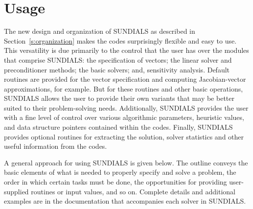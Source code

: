 \section{Usage} 
\label{s:usage}

The new design and organization of SUNDIALS 
as described in Section~\ref{s:organization}
makes the codes surprisingly flexible and easy to use.
This versatility is due primarily to the control that the user has
over the modules that comprise SUNDIALS: the specification of vectors;
the linear solver and preconditioner methods; the basic solvers; and,
sensitivity analysis.
Default routines are provided for the vector specification and
computing Jacobian-vector approximations, for example. But for these
routines and other basic operations, SUNDIALS allows the user to provide
their own variants that may be better suited to their problem-solving
needs. 
Additionally, SUNDIALS provides the user with a fine level of control
over various algorithmic parameters, heuristic values, and data
structure pointers contained within the codes.
Finally, SUNDIALS provides optional routines for extracting the
solution, solver statistics and other useful information from the codes.

A general approach for using SUNDIALS is given below. 
The outline conveys the basic elements of what is needed to properly
specify and solve a problem, the order in which certain tasks must be
done, the opportunities for providing user-supplied
routines or input values, and so on.
Complete details and additional examples are in the documentation that
accompanies each solver in SUNDIALS.

